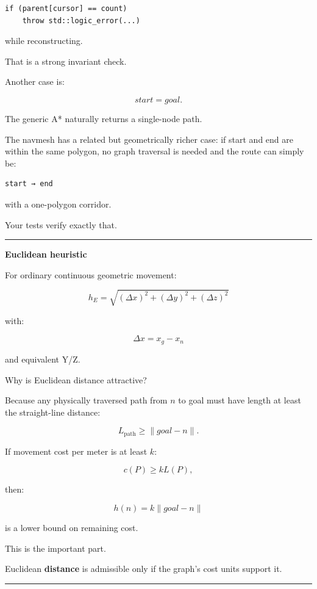 \begin{verbatim}
if (parent[cursor] == count)
    throw std::logic_error(...)
\end{verbatim}

while reconstructing.

That is a strong invariant check.

Another case is:

\[
start=goal.
\]

The generic A* naturally returns a single-node path.

The navmesh has a related but geometrically richer case: if start and end are within the same polygon, no graph traversal is needed and the route can simply be:

\begin{verbatim}
start → end
\end{verbatim}

with a one-polygon corridor.

Your tests verify exactly that.

\begin{center}\rule{0.5\linewidth}{0.5pt}\end{center}

\textbf{Euclidean heuristic}

For ordinary continuous geometric movement:

\[
\boxed{
h_E=
\sqrt{
(\Delta x)^2+
(\Delta y)^2+
(\Delta z)^2
}
}
\]

with:

\[
\Delta x=x_g-x_n
\]

and equivalent Y/Z.

Why is Euclidean distance attractive?

Because any physically traversed path from \(n\) to goal must have length at least the straight-line distance:

\[
L_{\text{path}}
\ge
\|goal-n\|.
\]

If movement cost per meter is at least \(k\):

\[
c(P)\ge kL(P),
\]

then:

\[
h(n)=k\|goal-n\|
\]

is a lower bound on remaining cost.

This is the important part.

Euclidean \textbf{distance} is admissible only if the graph's cost units support it.

\begin{center}\rule{0.5\linewidth}{0.5pt}\end{center}

